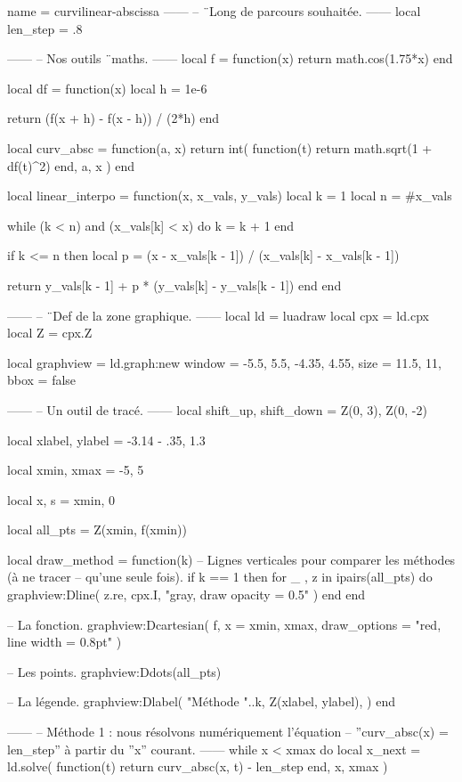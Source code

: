 \documentclass[border = 3pt]{standalone}
\begin{document}
\begin{luadraw*}{name = curvilinear-abscissa}
------
-- ¨Long de parcours souhaitée.
------
local len_step = .8

------
-- Nos outils ¨maths.
------
local f = function(x)
  return math.cos(1.75*x)
end

local df = function(x)
  local h = 1e-6

  return (f(x + h) - f(x - h)) / (2*h)
end

local curv_absc = function(a, x)
  return int(
    function(t)
      return math.sqrt(1 + df(t)^2)
    end,
    a, x
  )
end

local linear_interpo = function(x, x_vals, y_vals)
  local k = 1
  local n = #x_vals

  while (k < n) and (x_vals[k] < x) do
    k = k + 1
  end

  if k <= n then
    local p = (x - x_vals[k - 1]) / (x_vals[k] - x_vals[k - 1])

    return y_vals[k - 1] + p * (y_vals[k] - y_vals[k - 1])
  end
end

------
-- ¨Def de la zone graphique.
------
local ld  = luadraw
local cpx = ld.cpx
local Z   = cpx.Z

local graphview = ld.graph:new{
  window = {-5.5, 5.5, -4.35, 4.55},
  size   = {11.5, 11},
  bbox   = false
}

------
-- Un outil de tracé.
------
local shift_up, shift_down = Z(0, 3), Z(0, -2)

local xlabel, ylabel = -3.14 - .35, 1.3

local xmin, xmax = -5, 5

local x, s = xmin, 0

local all_pts = {Z(xmin, f(xmin))}

local draw_method = function(k)
-- Lignes verticales pour comparer les méthodes (à ne tracer
-- qu'une seule fois).
  if k == 1 then
    for _ , z in ipairs(all_pts) do
      graphview:Dline(
        {z.re, cpx.I},
        "gray, draw opacity = 0.5"
      )
    end
  end

-- La fonction.
  graphview:Dcartesian(
    f,
    {
      x = {xmin, xmax},
      draw_options = "red, line width = 0.8pt"
    }
  )

-- Les points.
  graphview:Ddots(all_pts)

-- La légende.
  graphview:Dlabel(
    "Méthode "..k, Z(xlabel, ylabel),
    {}
  )
end

------
-- Méthode 1 : nous résolvons numériquement l'équation
-- ''curv_absc(x) = len_step'' à partir du ''x'' courant.
------
while x < xmax do
  local x_next = ld.solve(
    function(t)
      return curv_absc(x, t) - len_step
    end,
    x, xmax
  )


\end{luadraw*}
\end{document}

